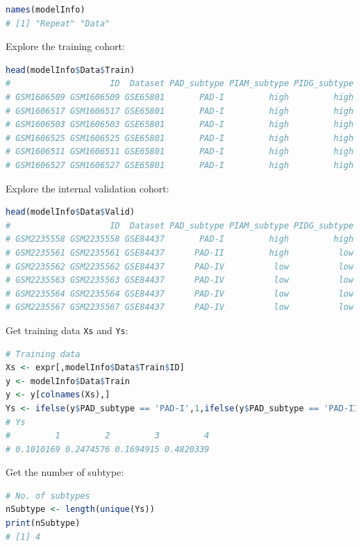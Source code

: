 \documentclass[
  12pt,
]{book}
\newcommand{\passthrough}[1]{#1}
\begin{document}
\begin{lstlisting}[language=R]
names(modelInfo)
# [1] "Repeat" "Data"
\end{lstlisting}

Explore the training cohort:

\begin{lstlisting}[language=R]
head(modelInfo$Data$Train)
#                    ID  Dataset PAD_subtype PIAM_subtype PIDG_subtype platform
# GSM1606509 GSM1606509 GSE65801       PAD-I         high         high GPL14550
# GSM1606517 GSM1606517 GSE65801       PAD-I         high         high GPL14550
# GSM1606503 GSM1606503 GSE65801       PAD-I         high         high GPL14550
# GSM1606525 GSM1606525 GSE65801       PAD-I         high         high GPL14550
# GSM1606511 GSM1606511 GSE65801       PAD-I         high         high GPL14550
# GSM1606527 GSM1606527 GSE65801       PAD-I         high         high GPL14550
\end{lstlisting}

Explore the internal validation cohort:

\begin{lstlisting}[language=R]
head(modelInfo$Data$Valid)
#                    ID  Dataset PAD_subtype PIAM_subtype PIDG_subtype platform
# GSM2235558 GSM2235558 GSE84437       PAD-I         high         high  GPL6947
# GSM2235561 GSM2235561 GSE84437      PAD-II         high          low  GPL6947
# GSM2235562 GSM2235562 GSE84437      PAD-IV          low          low  GPL6947
# GSM2235563 GSM2235563 GSE84437      PAD-IV          low          low  GPL6947
# GSM2235564 GSM2235564 GSE84437      PAD-IV          low          low  GPL6947
# GSM2235567 GSM2235567 GSE84437      PAD-IV          low          low  GPL6947
\end{lstlisting}

Get training data \passthrough{\lstinline!Xs!} and \passthrough{\lstinline!Ys!}:

\begin{lstlisting}[language=R]
# Training data
Xs <- expr[,modelInfo$Data$Train$ID]
y <- modelInfo$Data$Train
y <- y[colnames(Xs),]
Ys <- ifelse(y$PAD_subtype == 'PAD-I',1,ifelse(y$PAD_subtype == 'PAD-II',2,ifelse(y$PAD_subtype == 'PAD-III',3,ifelse(y$PAD_subtype == 'PAD-IV',4,NA)))); table(Ys)/length(Ys)
# Ys
#         1         2         3         4 
# 0.1010169 0.2474576 0.1694915 0.4820339
\end{lstlisting}

Get the number of subtype:

\begin{lstlisting}[language=R]
# No. of subtypes
nSubtype <- length(unique(Ys))
print(nSubtype)
# [1] 4
\end{lstlisting}
\end{document}
